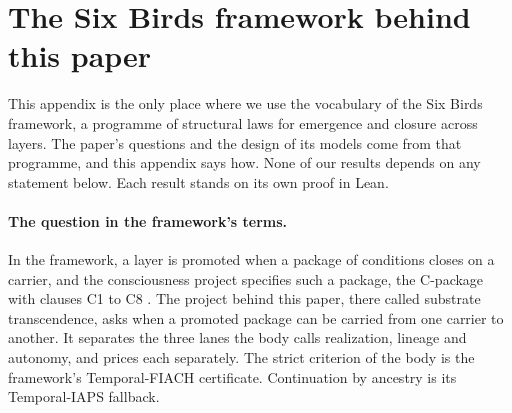 \section{The Six Birds framework behind this paper}
\label{app:sixbirds}

This appendix is the only place where we use the vocabulary of the Six Birds
framework, a programme of structural laws for emergence and closure across
layers. The paper's questions and the design of its models come from that
programme, and this appendix says how. None of our results depends on any
statement below. Each result stands on its own proof in Lean.

\paragraph{The question in the framework's terms.}
In the framework, a layer is promoted when a package of conditions closes on a
carrier, and the consciousness project specifies such a package, the
C-package with clauses C1 to C8 \citep{Tsiokos2026AuditedClosureArchitecture,
TsiokosArchitecture2026}. The project behind this paper, there called
substrate transcendence, asks when a promoted package can be carried from one
carrier to another. It separates the three lanes the body calls realization,
lineage and autonomy, and prices each separately. The strict criterion of the
body is the framework's Temporal-FIACH certificate. Continuation by ancestry is
its Temporal-IAPS fallback.

